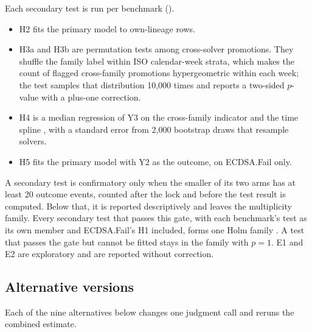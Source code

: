 Each secondary test is run per benchmark ().
\begin{itemize}
  \item H2 fits the primary model to own-lineage rows.
  \item H3a and H3b are permutation tests among cross-solver promotions. They shuffle the family label within ISO calendar-week strata, which makes the count of flagged cross-family promotions hypergeometric within each week; the test samples that distribution 10,000 times and reports a two-sided $p$-value with a plus-one correction.
  \item H4 is a median regression of Y3 on the cross-family indicator and the time spline \citep{koenker1978}, with a standard error from 2,000 bootstrap draws that resample solvers.
  \item H5 fits the primary model with Y2 as the outcome, on ECDSA.Fail only.
\end{itemize}
A secondary test is confirmatory only when the smaller of its two arms has at least 20 outcome events, counted after the lock and before the test result is computed.
Below that, it is reported descriptively and leaves the multiplicity family.
Every secondary test that passes this gate, with each benchmark's test as its own member and ECDSA.Fail's H1 included, forms one Holm family \citep{holm1979}.
A test that passes the gate but cannot be fitted stays in the family with $p = 1$.
E1 and E2 are exploratory and are reported without correction.

\subsection{Alternative versions}
\label{sec:sensitivity}

Each of the nine alternatives below changes one judgment call and reruns the combined estimate.

